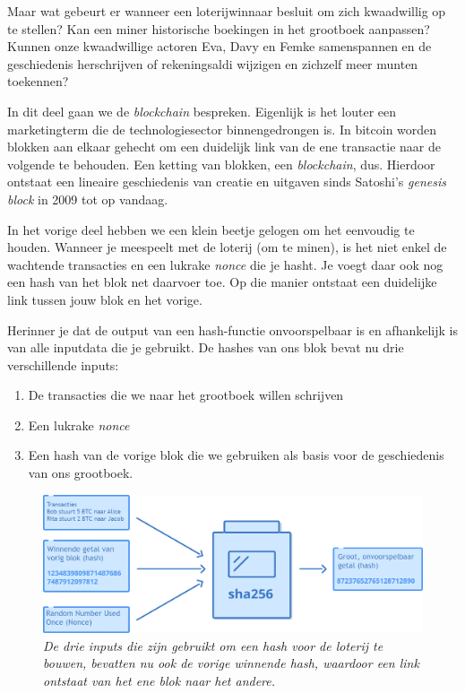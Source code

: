 \documentclass[smalldemyvopaper,11pt,twoside,onecolumn,openright,extrafontsizes]{memoir}
\begin{document}
Maar wat gebeurt er wanneer een loterijwinnaar besluit om zich kwaadwillig op te stellen? Kan een miner historische boekingen in het grootboek aanpassen? Kunnen onze kwaadwillige actoren Eva, Davy en Femke samenspannen en de geschiedenis herschrijven of rekeningsaldi wijzigen en zichzelf meer munten toekennen?

In dit deel gaan we de \textit{blockchain} bespreken. Eigenlijk is het louter een marketingterm die de technologiesector binnengedrongen is. In bitcoin worden blokken aan elkaar gehecht om een duidelijk link van de ene transactie naar de volgende te behouden. Een ketting van blokken, een \textit{blockchain}, dus. Hierdoor ontstaat een lineaire geschiedenis van creatie en uitgaven sinds Satoshi’s \textit{genesis block }in 2009 tot op vandaag.

In het vorige deel hebben we een klein beetje gelogen om het eenvoudig te houden. Wanneer je meespeelt met de loterij (om te minen), is het niet enkel de wachtende transacties en een lukrake \textit{nonce} die je hasht. Je voegt daar ook nog een hash van het blok net daarvoer toe. Op die manier ontstaat een duidelijke link tussen jouw blok en het vorige.

Herinner je dat de output van een hash-functie onvoorspelbaar is en afhankelijk is van alle inputdata die je gebruikt. De hashes van ons blok bevat nu drie verschillende inputs:

\begin{enumerate}
    \item De transacties die we naar het grootboek willen schrijven
    \item Een lukrake \textit{nonce}
    \item Een hash van de vorige blok die we gebruiken als basis voor de geschiedenis van ons grootboek.
\end{enumerate}




\begin{figure}
    \centering
    \includegraphics[width=\textwidth]{images/fig11.png}
    \caption{\footnotesize{\textit{De drie inputs die zijn gebruikt om een hash voor de loterij te bouwen, bevatten nu ook de vorige winnende hash, waardoor een link ontstaat van het ene blok naar het andere.}}}
    \label{fig11}
\end{figure}
\end{document}
